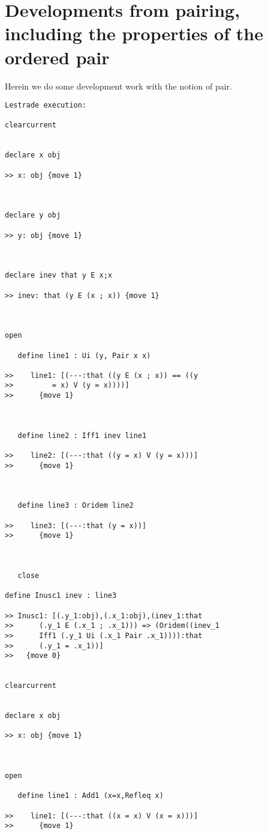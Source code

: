 \documentclass[12pt]{article}
\begin{document}
\section{Developments from pairing, including the properties of the ordered pair}

Herein we do some development work with the notion of pair.

\begin{verbatim}Lestrade execution:

clearcurrent


declare x obj

>> x: obj {move 1}



declare y obj

>> y: obj {move 1}



declare inev that y E x;x

>> inev: that (y E (x ; x)) {move 1}



open

   define line1 : Ui (y, Pair x x)

>>    line1: [(---:that ((y E (x ; x)) == ((y
>>         = x) V (y = x))))]
>>      {move 1}



   define line2 : Iff1 inev line1

>>    line2: [(---:that ((y = x) V (y = x)))]
>>      {move 1}



   define line3 : Oridem line2

>>    line3: [(---:that (y = x))]
>>      {move 1}



   close

define Inusc1 inev : line3

>> Inusc1: [(.y_1:obj),(.x_1:obj),(inev_1:that
>>      (.y_1 E (.x_1 ; .x_1))) => (Oridem((inev_1
>>      Iff1 (.y_1 Ui (.x_1 Pair .x_1)))):that
>>      (.y_1 = .x_1))]
>>   {move 0}


clearcurrent


declare x obj

>> x: obj {move 1}



open

   define line1 : Add1 (x=x,Refleq x)

>>    line1: [(---:that ((x = x) V (x = x)))]
>>      {move 1}




\end{verbatim}
\end{document}
